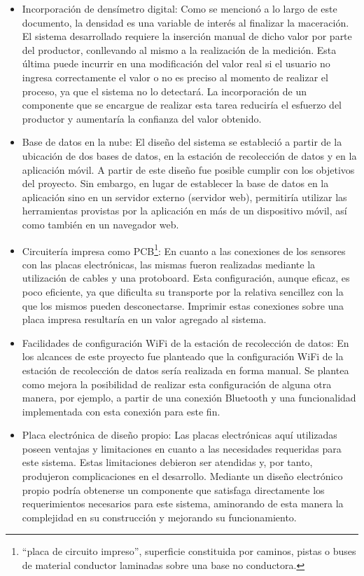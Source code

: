 \begin{itemize}
    \item Incorporación de densímetro digital: Como se mencionó a lo largo de este documento, la densidad es una variable de interés al finalizar la maceración. El sistema desarrollado requiere la inserción manual de dicho valor por parte del productor, conllevando al mismo a la realización de la medición. Esta última puede incurrir en una modificación del valor real si el usuario no ingresa correctamente el valor o no es preciso al momento de realizar el proceso, ya que el sistema no lo detectará. La incorporación de un componente que se encargue de realizar esta tarea reduciría el esfuerzo del productor y aumentaría la confianza del valor obtenido. 
    
    \item Base de datos en la nube: El diseño del sistema se estableció a partir de la ubicación de dos bases de datos, en la estación de recolección de datos y en la aplicación móvil. A partir de este diseño fue posible cumplir con los objetivos del proyecto. Sin embargo, en lugar de establecer la base de datos en la aplicación sino en un servidor externo (servidor web), permitiría utilizar las herramientas provistas por la aplicación en más de un dispositivo móvil, así como también en un navegador web.
    
    \item Circuitería impresa como PCB\footnote{“placa de circuito impreso”, superficie constituida por caminos, pistas o buses de material conductor laminadas sobre una base no conductora.}: En cuanto a las conexiones de los sensores con las placas electrónicas, las mismas fueron realizadas mediante la utilización de cables y una protoboard. Esta configuración, aunque eficaz, es poco eficiente, ya que dificulta su transporte por la relativa sencillez con la que los mismos pueden desconectarse. Imprimir estas conexiones sobre una placa impresa resultaría en un valor agregado al sistema.
    
    \item Facilidades de configuración WiFi\textsuperscript{\textregistered} de la estación de recolección de datos: En los alcances de este proyecto fue planteado que la configuración WiFi\textsuperscript{\textregistered} de la estación de recolección de datos sería realizada en forma manual. Se plantea como mejora la posibilidad de realizar esta configuración de alguna otra manera, por ejemplo, a partir de una conexión Bluetooth\textsuperscript{\textregistered} y una funcionalidad implementada con esta conexión para este fin.
    \item Placa electrónica de diseño propio: Las placas electrónicas aquí utilizadas poseen ventajas y limitaciones en cuanto a las necesidades requeridas para este sistema. Estas limitaciones debieron ser atendidas y, por tanto,  produjeron complicaciones en el desarrollo. Mediante un diseño electrónico propio podría obtenerse un componente que satisfaga directamente los requerimientos necesarios para este sistema, aminorando de esta manera la complejidad en su construcción y mejorando su funcionamiento.
    

\end{itemize}

